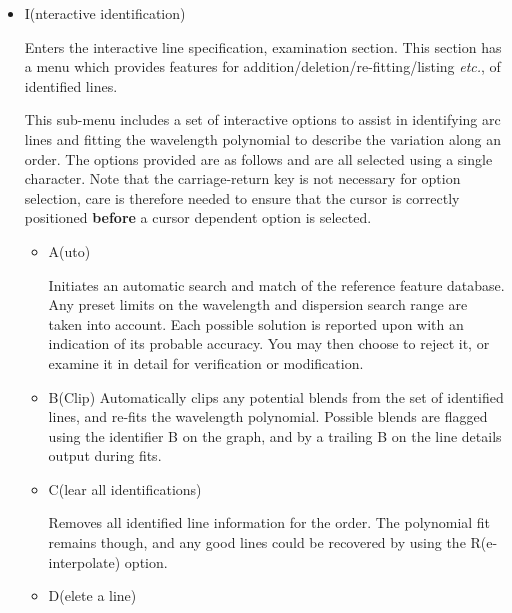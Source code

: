 \begin{itemize}
\item {\sunspec{\Large\tt}{\bf} I}(nteractive identification)

      Enters the interactive
      line specification, examination section. This section has a menu
      which provides features for addition/deletion/re-fitting/listing {\it
      etc.}, of identified lines.

      This sub-menu includes a set of interactive options to assist in
      identifying arc lines and fitting the wavelength polynomial to
      describe the variation along an order. The options provided are as
      follows and are all selected using a single character. Note that the
      carriage-return key is not necessary for option selection, care is
      therefore needed to ensure that the cursor is correctly positioned
      {\bf before} a cursor dependent option is selected.

      \begin{itemize}

      \item {\sunspec{\Large\tt}{\bf} A}(uto)

            Initiates an automatic search and match of
            the reference feature database. Any preset limits on the
            wavelength and dispersion search range are taken into account.
            Each possible solution is reported upon with an indication of
            its probable accuracy.  You may then choose to reject it,
            or examine it in detail for verification or modification.

      \item {\sunspec{\Large\tt}{\bf} B}(Clip)
            Automatically clips any potential blends
            from the set of identified lines, and re-fits the wavelength
            polynomial. Possible blends are flagged using the identifier B
            on the graph, and by a trailing B on the line details output
            during fits.

      \item {\sunspec{\Large\tt}{\bf} C}(lear all identifications)

            Removes all
            identified line information for the order. The polynomial fit
            remains though, and any good lines could be recovered by using
            the R(e-interpolate) option.

      \item {\sunspec{\Large\tt}{\bf} D}(elete a line)


\end{itemize}
\end{itemize}
